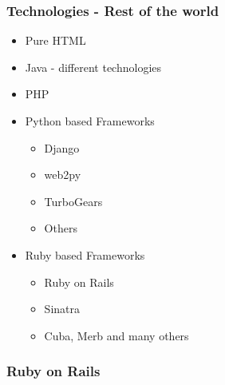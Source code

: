 \documentclass{beamer}
\theoremstyle{mystyle}
\begin{document}
    \begin{frame}
      \frametitle{Technologies - Rest of the world}
      \begin{itemize}
        \item Pure HTML
        \item Java - different technologies
        \item PHP
        \item Python based Frameworks
          \begin{itemize}
            \item Django
            \item web2py
            \item TurboGears
            \item Others
          \end{itemize}
        \item Ruby based Frameworks
          \begin{itemize}
            \item Ruby on Rails
            \item Sinatra
            \item Cuba, Merb and many others
          \end{itemize}
      \end{itemize}

    \end{frame}


    \subsubsection{Ruby on Rails}
\end{document}
